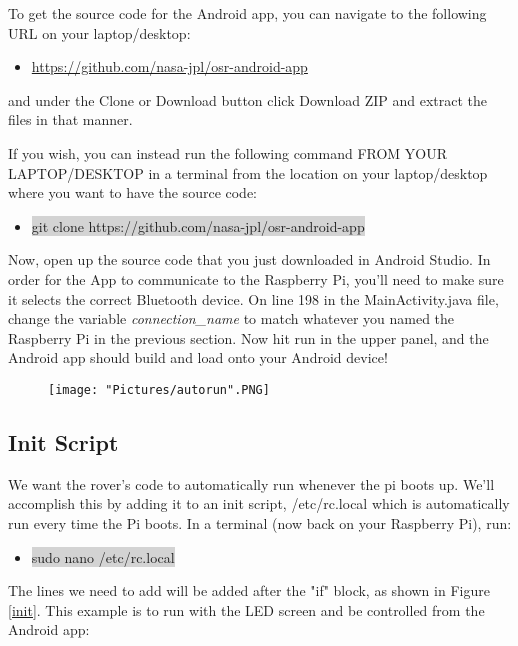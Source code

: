 \documentclass[12pt]{article}
\begin{document}
\bigskip

\noindent To get the source code for the Android app, you can navigate to the following URL on your laptop/desktop:

\begin{itemize}
	\item[] \href{https://github.com/nasa-jpl/osr-android-app}{https://github.com/nasa-jpl/osr-android-app}
\end{itemize}

\noindent and under the Clone or Download button click Download ZIP and extract the files in that manner. 

If you wish, you can instead run the following command FROM YOUR LAPTOP/DESKTOP in a terminal from the location on your laptop/desktop where you want to have the source code:

\begin{itemize}
	\item[] \colorbox{lightgray}{git clone https://github.com/nasa-jpl/osr-android-app}
\end{itemize}

\bigskip

\noindent Now, open up the source code that you just downloaded in Android Studio. In order for the App to communicate to the Raspberry Pi, you'll need to make sure it selects the correct Bluetooth device. On line 198 in the MainActivity.java file, change the variable \textit{connection\_name} to match whatever you named the Raspberry Pi in the previous section. Now hit run in the upper panel, and the Android app should build and load onto your Android device!

\begin{figure}[H]
 	\centering
	\texttt{[image: "Pictures/autorun".PNG]}
 	\caption{}
	\label{}
\end{figure}


\subsection{Init Script}
We want the rover's code to automatically run whenever the pi boots up. We'll accomplish this by adding it to an init script, /etc/rc.local which is automatically run every time the Pi boots. In a terminal (now back on your Raspberry Pi), run:
\begin{itemize}
	\item[] \colorbox{lightgray}{sudo nano /etc/rc.local}
\end{itemize}
\noindent The lines we need to add will be added after the "if" block, as shown in Figure \ref{init}. This example is to run with the LED screen and be controlled from the Android app:
\end{document}
